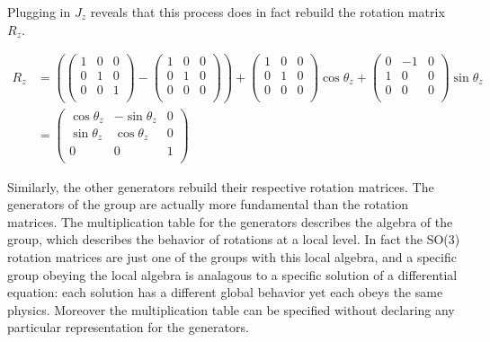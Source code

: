Plugging in $J_z$ reveals that this process does in fact rebuild the rotation matrix $R_z$.

\begin{equation}
\begin{split}
R_z &= 
(\begin{pmatrix}
1 & 0 & 0 \\
0 & 1 & 0 \\
0 & 0 & 1 \\
\end{pmatrix}
-
\begin{pmatrix}
1 & 0 & 0 \\
0 & 1 & 0 \\
0 & 0 & 0 \\
\end{pmatrix})
+
\begin{pmatrix}
1 & 0 & 0 \\
0 & 1 & 0 \\
0 & 0 & 0 \\
\end{pmatrix}
\cos\theta_z
+
\begin{pmatrix}
0 & -1 & 0 \\
1 & 0 & 0 \\
0 & 0 & 0 \\
\end{pmatrix}
\sin\theta_z
\\ &=
\begin{pmatrix}
\cos\theta_z & -\sin\theta_z & 0 \\
\sin\theta_z & \cos\theta_z & 0 \\
0 & 0 & 1 \\
\end{pmatrix}
\end{split}
\end{equation}

Similarly, the other generators rebuild their respective rotation matrices. The generators of the group are actually more fundamental than the rotation matrices. The multiplication table for the generators describes the algebra of the group, which describes the behavior of rotations at a local level. In fact the SO(3) rotation matrices are just one of the groups with this local algebra, and a specific group obeying the local algebra is analagous to a specific solution of a differential equation: each solution has a different global behavior yet each obeys the same physics. Moreover the multiplication table can be specified without declaring any particular representation for the generators. 

